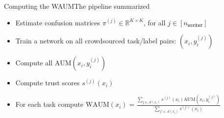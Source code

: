 \begin{frame}{Computing the WAUM}{The pipeline summarized}
    \begin{itemize}[label=$\bullet$]
        \item Estimate confusion matrices $\pi^{(j)} \in \mathbb{R}^{K\times K}$, for all $j\in [n_{\texttt{worker}}]$


              \pause

        \item Train a network on all crowdsourced task/label pairs:  $(x_i, y_i^{(j)})$

              \vspace{0.05cm}
              \pause

        \item Compute all $\displaystyle\mathrm{AUM}(x_i, y_i^{(j)})$
              \vspace{0.1cm}

              \pause

        \item Compute trust scores $s^{(j)}(x_i)$

              \vspace{-0.1cm}

              \pause

        \item For each task compute $\mathrm{WAUM}(x_i)=\frac{\displaystyle\sum_{j \in \mathcal{A}(x_i)} s^{(j)}(x_i) \mathrm{AUM}(x_i, y_i^{(j)})}{\displaystyle\sum_{j' \in \mathcal{A}(x_i)} s^{(j')}(x_i)}$


\end{itemize}
\end{frame}
